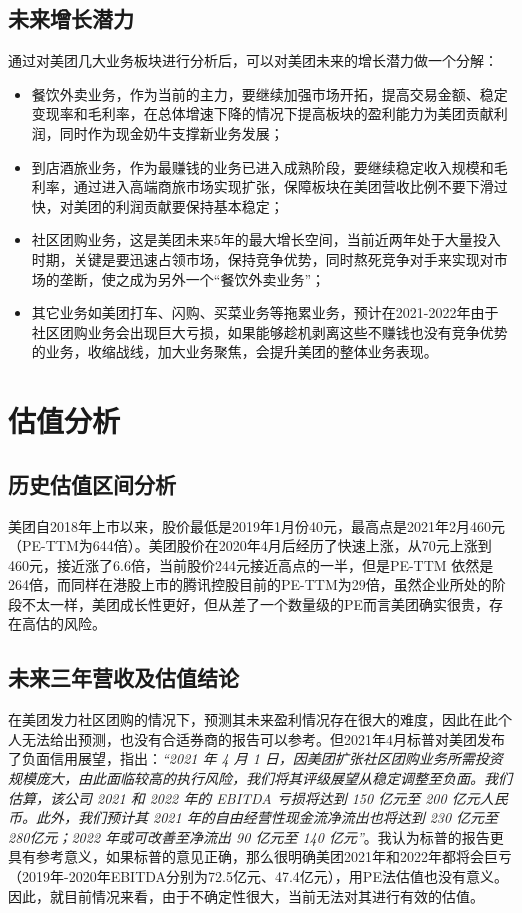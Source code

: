 \documentclass[UTF8,a4paper,12pt,lang=cn,fontset = windows]{elegantpaper} %
\begin{document}
\subsection{未来增长潜力}
通过对美团几大业务板块进行分析后，可以对美团未来的增长潜力做一个分解：
\begin{itemize}
  \item 餐饮外卖业务，作为当前的主力，要继续加强市场开拓，提高交易金额、稳定变现率和毛利率，在总体增速下降的情况下提高板块的盈利能力为美团贡献利润，同时作为现金奶牛支撑新业务发展；
  \item 到店酒旅业务，作为最赚钱的业务已进入成熟阶段，要继续稳定收入规模和毛利率，通过进入高端商旅市场实现扩张，保障板块在美团营收比例不要下滑过快，对美团的利润贡献要保持基本稳定；
  \item 社区团购业务，这是美团未来5年的最大增长空间，当前近两年处于大量投入时期，关键是要迅速占领市场，保持竞争优势，同时熬死竞争对手来实现对市场的垄断，使之成为另外一个“餐饮外卖业务”；
  \item 其它业务如美团打车、闪购、买菜业务等拖累业务，预计在2021-2022年由于社区团购业务会出现巨大亏损，如果能够趁机剥离这些不赚钱也没有竞争优势的业务，收缩战线，加大业务聚焦，会提升美团的整体业务表现。
  \end{itemize}
\section{估值分析}
\subsection{历史估值区间分析}
美团自2018年上市以来，股价最低是2019年1月份40元，最高点是2021年2月460元（PE-TTM为644倍）。美团股价在2020年4月后经历了快速上涨，从70元上涨到460元，接近涨了6.6倍，当前股价244元接近高点的一半，但是PE-TTM 依然是264倍，而同样在港股上市的腾讯控股目前的PE-TTM为29倍，虽然企业所处的阶段不太一样，美团成长性更好，但从差了一个数量级的PE而言美团确实很贵，存在高估的风险。

\subsection{未来三年营收及估值结论}
在美团发力社区团购的情况下，预测其未来盈利情况存在很大的难度，因此在此个人无法给出预测，也没有合适券商的报告可以参考。但2021年4月标普对美团发布了负面信用展望，指出：\textit{“2021 年 4 月 1 日，因美团扩张社区团购业务所需投资规模庞大，由此面临较高的执行风险，我们将其评级展望从稳定调整至负面。我们估算，该公司 2021 和 2022 年的 EBITDA 亏损将达到 150 亿元至 200 亿元人民币。此外，我们预计其 2021 年的自由经营性现金流净流出也将达到 230 亿元至 280亿元；2022 年或可改善至净流出 90 亿元至 140 亿元”}。我认为标普的报告更具有参考意义，如果标普的意见正确，那么很明确美团2021年和2022年都将会巨亏（2019年-2020年EBITDA分别为72.5亿元、47.4亿元），用PE法估值也没有意义。因此，就目前情况来看，由于不确定性很大，当前无法对其进行有效的估值。
\end{document}
